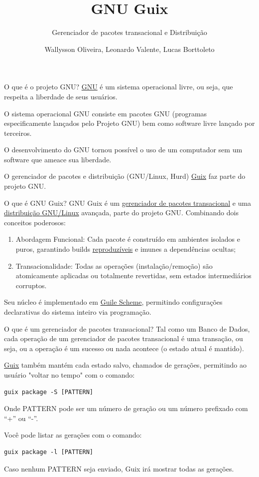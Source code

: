 \documentclass[bigger]{beamer}
\author{Wallysson Oliveira, Leonardo Valente, Lucas Borttoleto}
\date{}
\title{GNU Guix}
\subtitle{Gerenciador de pacotes transacional e Distribuição}
\begin{document}
\maketitle
\begin{frame}[label={sec:orgdb8527e}]{O que é o projeto GNU?}
\href{https://www.gnu.org/home.en.html}{GNU} é um sistema operacional livre, ou seja, que respeita a liberdade de seus usuários.

O sistema operacional GNU consiste em pacotes GNU (programas especificamente lançados pelo Projeto GNU)
bem como software livre lançado por terceiros.

O desenvolvimento do GNU tornou possível o uso de um computador sem um software que ameace sua liberdade.

O gerenciador de pacotes e distribuição (GNU/Linux, Hurd) \href{https://guix.gnu.org/}{Guix} faz parte do projeto GNU.
\end{frame}
\begin{frame}[label={sec:org657ae43}]{O que é GNU Guix?}
GNU Guix é um \href{https://guix.gnu.org}{gerenciador de pacotes transacional} e uma \href{https://guix.gnu.org/manual/en/html\_node/System-Installation.html}{distribuição GNU/Linux} avançada, parte do projeto GNU.
Combinando dois conceitos poderosos:

\begin{enumerate}
\item Abordagem Funcional: Cada pacote é construído em ambientes isolados e puros,
garantindo builds \href{https://guix.gnu.org/manual/en/html\_node/Features.html}{reproduzíveis} e imunes a dependências ocultas;
\item Transacionalidade: Todas as operações (instalação/remoção) são atomicamente aplicadas ou totalmente
revertidas, sem estados intermediários corruptos.
\end{enumerate}

Seu núcleo é implementado em \href{https://www.gnu.org/software/guile}{Guile Scheme}, permitindo configurações declarativas do sistema inteiro via
programação.
\end{frame}
\begin{frame}[label={sec:org1c49eca},fragile]{O que é um gerenciador de pacotes transacional?}
 Tal como um Banco de Dados, cada operação de um gerenciador de pacotes transacional é uma transação, ou seja,
ou a operação é um sucesso ou nada acontece (o estado atual é mantido).

\href{https://guix.gnu.org/manual/en/html\_node/Package-Management.html}{Guix} também mantém cada estado salvo, chamados de gerações, permitindo ao usuário "voltar no tempo" com
o comando:
\begin{verbatim}
guix package -S [PATTERN]
\end{verbatim}
Onde PATTERN pode ser um número de geração ou um número prefixado com “+” ou “-”.

Você pode listar as gerações com o comando:
\begin{verbatim}
guix package -l [PATTERN]
\end{verbatim}
Caso nenhum PATTERN seja enviado, Guix irá mostrar todas as gerações.
\end{frame}
\end{document}

